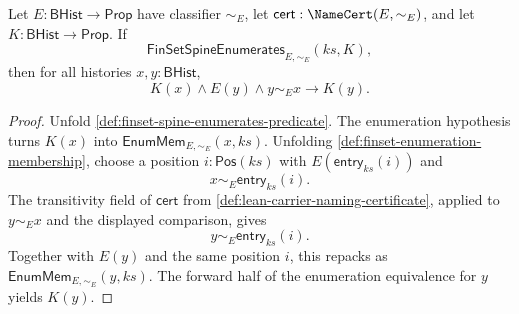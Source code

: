 \begin{lemma}
\label{lem:finset-subset-classifier-saturation}
Let $E:\mathsf{BHist}\to\mathsf{Prop}$ have classifier $\sim_E$, let $\mathsf{cert}:\NameCert(E,\sim_E)$, and let $K:\mathsf{BHist}\to\mathsf{Prop}$. If
$$
\mathsf{FinSetSpineEnumerates}_{E,\sim_E}(ks,K),
$$
then for all histories $x,y:\mathsf{BHist}$,
$$
K(x)\land E(y)\land y\sim_E x\to K(y).
$$
\end{lemma}
\begin{proof}
Unfold \autoref{def:finset-spine-enumerates-predicate}. The enumeration hypothesis turns $K(x)$ into $\mathsf{EnumMem}_{E,\sim_E}(x,ks)$. Unfolding \autoref{def:finset-enumeration-membership}, choose a position $i:\mathsf{Pos}(ks)$ with $E(\mathsf{entry}_{ks}(i))$ and
$$
x\sim_E\mathsf{entry}_{ks}(i).
$$
The transitivity field of $\mathsf{cert}$ from \autoref{def:lean-carrier-naming-certificate}, applied to $y\sim_E x$ and the displayed comparison, gives
$$
y\sim_E\mathsf{entry}_{ks}(i).
$$
Together with $E(y)$ and the same position $i$, this repacks as $\mathsf{EnumMem}_{E,\sim_E}(y,ks)$. The forward half of the enumeration equivalence for $y$ yields $K(y)$.
\end{proof}

